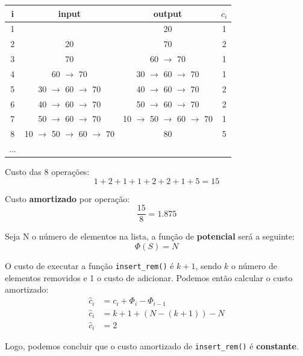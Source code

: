 \documentclass[a4paper,11pt]{article}
\begin{document}
	\begin{center}
	\begin{tabular}{|c|c|c|c|}
		\hline
		i & input & output & $ c_i $ \\
		\hline
		\hline
		1 & & 20 & 1 \\
		2 & 20 & 70 & 2 \\
		3 & 70 & 60 $\rightarrow$ 70 & 1 \\
		4 & 60 $\rightarrow$ 70 & 30 $\rightarrow$ 60 $\rightarrow$ 70 & 1 \\
		5 & 30 $\rightarrow$ 60 $\rightarrow$ 70 & 40 $\rightarrow$ 60 $\rightarrow$ 70 & 2 \\
		6 & 40 $\rightarrow$ 60 $\rightarrow$ 70 & 50 $\rightarrow$ 60 $\rightarrow$ 70 & 2 \\
		7 & 50 $\rightarrow$ 60 $\rightarrow$ 70 & 10 $\rightarrow$ 50 $\rightarrow$ 60 $\rightarrow$ 70 & 1 \\
		8 & 10 $\rightarrow$ 50 $\rightarrow$ 60 $\rightarrow$ 70 & 80 & 5 \\
		... & & & \\
		\hline
	\end{tabular}
	\end{center}
	
	\newpage
	
	\noindent Custo das 8 operações:
	\[
		1 + 2 + 1 + 1 + 2 + 2 + 1 + 5 = 15
	\]
	
	\noindent Custo \textbf{amortizado} por operação:
	\[
		\frac{15}{8} = 1.875
	\]
	
	\noindent Seja N o número de elementos na lista, a função de \textbf{potencial} será a seguinte:
	\[
		\Phi(S) = N
	\]

	\noindent O custo de executar a função \texttt{insert\_rem()} é $ k + 1 $, sendo $k$ o número de elementos removidos e 1 o custo de adicionar. Podemos então calcular o custo amortizado:
	\begin{align*}
		\hat{c}_i & = c_i + \Phi_i - \Phi_{i-1} \\
		\hat{c}_i & = k + 1 + (N - (k + 1)) - N \\
		\hat{c}_i & = 2
	\end{align*}
	
	\noindent Logo, podemos concluir que o custo amortizado de \texttt{insert\_rem()} é \textbf{constante}.
	
	
\end{document}
